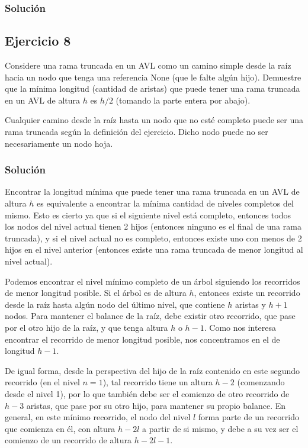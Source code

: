 \documentclass{article}
\begin{document}
\subsubsection*{Solución}



\subsection*{Ejercicio 8}
Considere una rama truncada en un AVL como un camino simple desde la raíz hacia un nodo que tenga una referencia None (que le falte algún hijo). Demuestre que la mínima longitud (cantidad de aristas) que puede tener una rama truncada en un AVL de altura $h$ es $h/2$ (tomando la parte entera por abajo).

Cualquier camino desde la raíz hasta un nodo que no esté completo puede ser una rama truncada según la definición del ejercicio. Dicho nodo puede no ser necesariamente un nodo hoja.
\subsubsection*{Solución}
Encontrar la longitud mínima que puede tener una rama truncada en un AVL de altura $h$ es equivalente a encontrar la mínima cantidad de niveles completos del mismo. Esto es cierto ya que si el siguiente nivel está completo, entonces todos los nodos del nivel actual tienen 2 hijos (entonces ninguno es el final de una rama truncada), y si el nivel actual no es completo, entonces existe uno con menos de 2 hijos en el nivel anterior (entonces existe una rama truncada de menor longitud al nivel actual).

Podemos encontrar el nivel mínimo completo de un árbol siguiendo los recorridos de menor longitud posible. Si el árbol es de altura $h$, entonces existe un recorrido desde la raíz hasta algún nodo del último nivel, que contiene $h$ aristas y $h+1$ nodos. Para mantener el balance de la raíz, debe existir otro recorrido, que pase por el otro hijo de la raíz, y que tenga altura $h$ o $h-1$. Como nos interesa encontrar el recorrido de menor longitud posible, nos concentramos en el de longitud $h-1$.

De igual forma, desde la perspectiva del hijo de la raíz contenido en este segundo recorrido (en el nivel $n=1$), tal recorrido tiene un altura $h-2$ (comenzando desde el nivel 1), por lo que también debe ser el comienzo de otro recorrido de $h-3$ aristas, que pase por su otro hijo, para mantener su propio balance. En general, en este mínimo recorrido, el nodo del nivel $l$ forma parte de un recorrido que comienza en él, con altura $h-2l$ a partir de si mismo, y debe a su vez ser el comienzo de un recorrido de altura $h-2l-1$.
\end{document}
